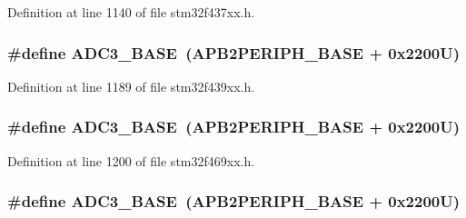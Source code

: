 Definition at line 1140 of file stm32f437xx.\+h.

\subsubsection[{\texorpdfstring{A\+D\+C3\+\_\+\+B\+A\+SE}{ADC3_BASE}}]{\setlength{\rightskip}{0pt plus 5cm}\#define A\+D\+C3\+\_\+\+B\+A\+SE~({\bf A\+P\+B2\+P\+E\+R\+I\+P\+H\+\_\+\+B\+A\+SE} + 0x2200\+U)}\hypertarget{group___peripheral__memory__map_gaca766f86c8e0b00a8e2b0224dcbb4c82}{}\label{group___peripheral__memory__map_gaca766f86c8e0b00a8e2b0224dcbb4c82}


Definition at line 1189 of file stm32f439xx.\+h.

\subsubsection[{\texorpdfstring{A\+D\+C3\+\_\+\+B\+A\+SE}{ADC3_BASE}}]{\setlength{\rightskip}{0pt plus 5cm}\#define A\+D\+C3\+\_\+\+B\+A\+SE~({\bf A\+P\+B2\+P\+E\+R\+I\+P\+H\+\_\+\+B\+A\+SE} + 0x2200\+U)}\hypertarget{group___peripheral__memory__map_gaca766f86c8e0b00a8e2b0224dcbb4c82}{}\label{group___peripheral__memory__map_gaca766f86c8e0b00a8e2b0224dcbb4c82}


Definition at line 1200 of file stm32f469xx.\+h.

\subsubsection[{\texorpdfstring{A\+D\+C3\+\_\+\+B\+A\+SE}{ADC3_BASE}}]{\setlength{\rightskip}{0pt plus 5cm}\#define A\+D\+C3\+\_\+\+B\+A\+SE~({\bf A\+P\+B2\+P\+E\+R\+I\+P\+H\+\_\+\+B\+A\+SE} + 0x2200\+U)}\hypertarget{group___peripheral__memory__map_gaca766f86c8e0b00a8e2b0224dcbb4c82}{}\label{group___peripheral__memory__map_gaca766f86c8e0b00a8e2b0224dcbb4c82}


